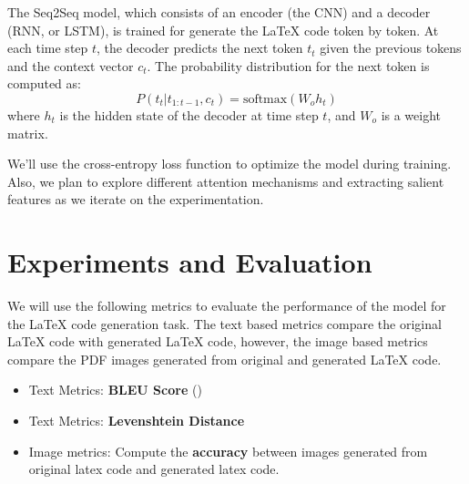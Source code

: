 \documentclass{article}
\begin{document}
The Seq2Seq model, which consists of an encoder (the CNN) and a decoder (RNN, or LSTM), is trained for generate the LaTeX code token by token. At each time step \( t \), the decoder predicts the next token \( t_t \) given the previous tokens and the context vector \( c_t \). The probability distribution for the next token is computed as:
\[
P(t_t | t_{1:t-1}, c_t) = \text{softmax}(W_o h_t)
\]
where \( h_t \) is the hidden state of the decoder at time step \( t \), and \( W_o \) is a weight matrix.



We'll use the cross-entropy loss function to optimize the model during training. Also, we plan to explore different attention mechanisms and extracting salient features as we iterate on the experimentation.


\section{Experiments and Evaluation}

We will use the following metrics to evaluate the performance of the model for the LaTeX code generation task. The text based metrics compare the original LaTeX code with generated LaTeX code, however, the image based metrics compare the PDF images generated from original and generated LaTeX code.

\begin{itemize}
    \item Text Metrics: \textbf{BLEU Score} (\cite{papineni-etal-2002-bleu})
    \item Text Metrics: \textbf{Levenshtein Distance}
    \item Image metrics: Compute the \textbf{accuracy} between images generated from original latex code and generated latex code. 
\end{itemize}
\end{document}
